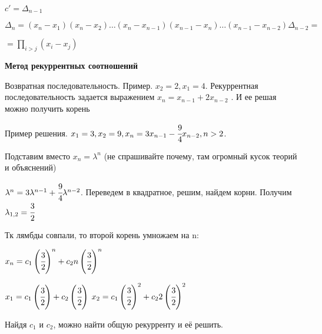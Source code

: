 \(c' = \Delta_{n - 1}\)

\(\Delta_n = (x_n - x_1)(x_n - x_2)\ldots(x_n - x_{n - 1})(x_{n - 1} - x_n)\ldots(x_{n - 1} - x_{n - 2}) \Delta_{n - 2} =\)

\(= \prod\limits_{i > j}(x_i - x_j)\)

\textbf{Метод рекуррентных соотношений}

Возвратная последовательность. Пример.  \(x_2 = 2, x_1 = 4\). Рекуррентная последовательность задается выражением \(x_n = x_{n - 1} + 2 x_{n - 2}\) . И ее решая можно получить  корень

Пример решения. \(x_1 = 3, x_2 = 9, x_n = 3 x_{n-1} - \cfrac{9}{4} x_{n-2}, n >2\).

Подставим вместо \(x_n = \lambda^n \) (не спрашивайте почему, там огромный кусок теорий и объяснений)

\( \lambda^n  = 3\lambda^{n-1} +  \cfrac{9}{4}\lambda^{n-2}\). Переведем в квадратное, решим, найдем корни. Получим \(\lambda_{1,2} = \cfrac{3}{2}\)

Тк лямбды совпали, то второй корень умножаем на n:

\(x_n  = c_1 \left(\cfrac{3}{2}\right)^n  + c_2 n \left(\cfrac{3}{2}\right)^n \)

\(x_1 = c_1 \left(\cfrac{3}{2}\right) + c_2 \left(\cfrac{3}{2}\right)\)
\(x_2 = c_1 \left(\cfrac{3}{2}\right)^2 + c_2 2 \left(\cfrac{3}{2}\right)^2\)

Найдя \(c_1\) и \(c_2\), можно найти общую рекурренту и её решить.

